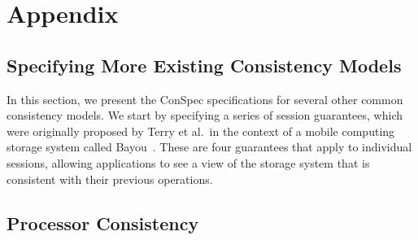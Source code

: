 \documentclass[journal, compsoc]{IEEEtran}
\begin{document}
	
	
	\section{Appendix}
	\subsection{Specifying  More Existing Consistency Models}\label{sec:morelist}
	In this section, we present the ConSpec specifications for several other common
	consistency models. 
	We start by specifying a series of session guarantees, which were originally proposed by Terry et al.\ in the context of a mobile computing storage system called Bayou~\cite{Terry:1994:SGW:645792.668302}. These are four guarantees that apply to individual sessions, allowing applications to see a view of the storage system that is consistent with their previous operations.
	
	\subsection{Processor Consistency}
	
\end{document}
